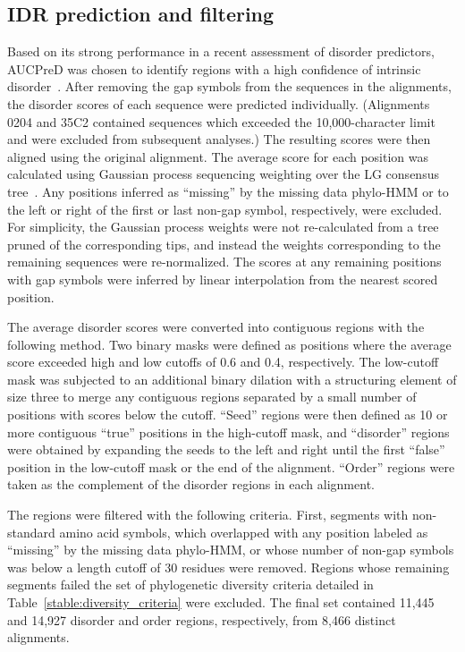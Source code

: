 \subsection{IDR prediction and filtering}
Based on its strong performance in a recent assessment of disorder predictors, AUCPreD was chosen to identify regions with a high confidence of intrinsic disorder~\cite{Wang2016, Necci2021}. After removing the gap symbols from the sequences in the alignments, the disorder scores of each sequence were predicted individually. (Alignments 0204 and 35C2 contained sequences which exceeded the 10,000-character limit and were excluded from subsequent analyses.) The resulting scores were then aligned using the original alignment. The average score for each position was calculated using Gaussian process sequencing weighting over the LG consensus tree~\cite{Altschul1989}. Any positions inferred as ``missing'' by the missing data phylo-HMM or to the left or right of the first or last non-gap symbol, respectively, were excluded. For simplicity, the Gaussian process weights were not re-calculated from a tree pruned of the corresponding tips, and instead the weights corresponding to the remaining sequences were re-normalized. The scores at any remaining positions with gap symbols were inferred by linear interpolation from the nearest scored position.

The average disorder scores were converted into contiguous regions with the following method. Two binary masks were defined as positions where the average score exceeded high and low cutoffs of 0.6 and 0.4, respectively. The low-cutoff mask was subjected to an additional binary dilation with a structuring element of size three to merge any contiguous regions separated by a small number of positions with scores below the cutoff. ``Seed'' regions were then defined as 10 or more contiguous ``true'' positions in the high-cutoff mask, and ``disorder'' regions were obtained by expanding the seeds to the left and right until the first ``false'' position in the low-cutoff mask or the end of the alignment. ``Order'' regions were taken as the complement of the disorder regions in each alignment.

The regions were filtered with the following criteria. First, segments with non-standard amino acid symbols, which overlapped with any position labeled as ``missing'' by the missing data phylo-HMM, or whose number of non-gap symbols was below a length cutoff of 30 residues were removed. Regions whose remaining segments failed the set of phylogenetic diversity criteria detailed in Table~\ref{stable:diversity_criteria} were excluded. The final set contained 11,445 and 14,927 disorder and order regions, respectively, from 8,466 distinct alignments.

